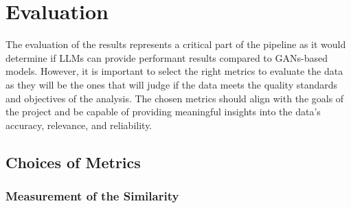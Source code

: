 \chapter{Evaluation}
\label{chap:Evaluation}

The evaluation of the results represents a critical part of the pipeline as it would determine if LLMs can provide performant results compared to GANs-based models.
However, it is important to select the right metrics to evaluate the data as they will be the ones that will judge if the data meets the quality standards and objectives of the analysis. The chosen metrics should align with the goals of the project and be capable of providing meaningful insights into the data's accuracy, relevance, and reliability.

\section{Choices of Metrics}


\subsection{Measurement of the Similarity}

